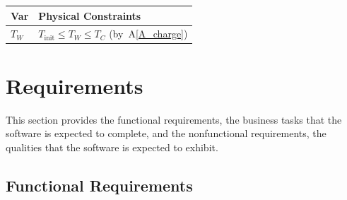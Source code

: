 \documentclass[12pt]{article}
\newcommand{\aref}[1]{A\ref{#1}}
\begin{document}
\begin{table}[!h]
\caption{Output Variables} \label{TblOutputVar}
\renewcommand{\arraystretch}{1.2}
\noindent \begin{longtable*}{l l} 
  \toprule
  \textbf{Var} & \textbf{Physical Constraints} \\
  \midrule 
  $T_W$ & $T_\text{init} \leq T_W \leq T_C$ (by~\aref{A_charge})
  \\
  \bottomrule
\end{longtable*}
\end{table}

\section{Requirements}

This section provides the functional requirements, the business tasks that the
software is expected to complete, and the nonfunctional requirements, the
qualities that the software is expected to exhibit.

\subsection{Functional Requirements}
\end{document}
